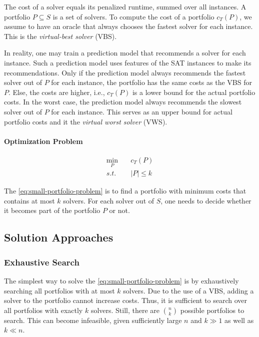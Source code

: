 \documentclass[conference]{IEEEtran}
\begin{document}
The cost of a solver equals its penalized runtime, summed over all instances.
A portfolio $P \subseteq S$ is a set of solvers.
To compute the cost of a portfolio $c_{T}(P)$, we assume to have an oracle that always chooses the fastest solver for each instance.
This is the \emph{virtual-best solver} (VBS).

In reality, one may train a prediction model that recommends a solver for each instance.
Such a prediction model uses features of the SAT instances to make its recommendations.
Only if the prediction model always recommends the fastest solver out of $P$ for each instance, the portfolio has the same costs as the VBS for $P$.
Else, the costs are higher, i.e., $c_{T}(P)$ is a lower bound for the actual portfolio costs.
In the worst case, the prediction model always recommends the slowest solver out of $P$ for each instance.
This serves as an upper bound for actual portfolio costs and it the \emph{virtual worst solver} (VWS).

\paragraph{Optimization Problem}

\begin{equation}
	\label{eq:small-portfolio-problem}
	\begin{aligned}
		\min_P \quad & c_{T}(P)\\
		s.t. \quad & |P| \leq k
	\end{aligned}
   \tag{Small-Portfolio Problem}
\end{equation}

The \ref{eq:small-portfolio-problem} is to find a portfolio with minimum costs that contains at most $k$ solvers.
For each solver out of $S$, one needs to decide whether it becomes part of the portfolio $P$ or not.

\subsection{Solution Approaches}

\subsubsection{Exhaustive Search}

The simplest way to solve the \ref{eq:small-portfolio-problem} is by exhaustively searching all portfolios with at most $k$ solvers.
Due to the use of a VBS, adding a solver to the portfolio cannot increase costs.
Thus, it is sufficient to search over all portfolios with exactly $k$ solvers.
Still, there are $\binom{n}{k}$ possible portfolios to search.
This can become infeasible, given sufficiently large $n$ and $k \gg 1$ as well as $k \ll n$.
\end{document}

